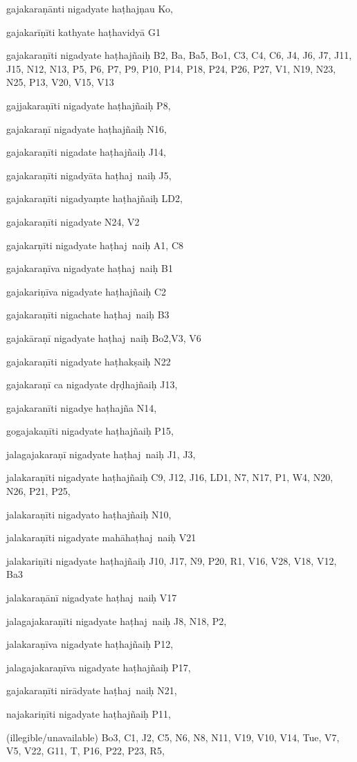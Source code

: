 \begin{ekdosis}
\begin{marma}[hp01_055]
\begin{marma}[hp02_009]
\begin{marma}[hp02_011]
 \begin{marma}[hp02_26d]
\item[gajakaraṇānti nigadyate haṭhajṇau] Ko,
\item[gajakarīṇīti kathyate haṭhavidyā] G1
\item[gajakaraṇīti nigadyate haṭhajñaiḥ] B2, Ba, Ba5, Bo1, C3, C4, C6, J4, J6, J7, J11, J15, N12, N13, P5, P6, P7, P9, P10, P14, P18, P24, P26, P27, V1, N19, N23, N25, P13, V20, V15, V13
\item[gajjakaraṇīti nigadyate haṭhajñaiḥ] P8, 
\item[gajakaraṇī nigadyate haṭhajñaiḥ] N16, 
\item[gajakaraṇīti nigadate haṭhajñaiḥ] J14,
\item[gajakaraṇīti nigadyāta haṭhaj~naiḥ] J5,
\item[gajakaraṇīti nigadyaṃte haṭhajñaiḥ] LD2,
\item[gajakaraṇīti nigadyate] N24, V2
\item[gajakarṇīti nigadyate haṭhaj~naiḥ] A1, C8
\item[gajakaraṇīva nigadyate haṭhaj~naiḥ] B1
\item[gajakariṇīva nigadyate haṭhajñaiḥ] C2
\item[gajakaraṇīti nigachate haṭhaj~naiḥ] B3
\item[gajakāraṇī nigadyate haṭhaj~naiḥ] Bo2,V3, V6
\item[gajakaraṇīti nigadyate haṭhakṣaiḥ] N22
\item[gajakaraṇī ca nigadyate dṛḍhajñaiḥ] J13,
\item[gajakaranīti nigadye haṭhajña] N14, 
\item[gogajakaṇīti nigadyate haṭhajñaiḥ] P15, 
\item[jalagajakaraṇī nigadyate haṭhaj~naiḥ] J1, J3, 
\item[jalakaraṇīti nigadyate haṭhajñaiḥ] C9, J12, J16, LD1, N7, N17, P1, W4, N20, N26, P21, P25, 
\item[jalakaraṇīti nigadyato haṭhajñaiḥ] N10,
\item[jalakaraṇīti nigadyate mahāhaṭhaj~naiḥ] V21
\item[jalakariṇīti nigadyate haṭhajñaiḥ] J10, J17, N9, P20, R1, V16, V28, V18, V12, Ba3
\item[jalakaraṇānī nigadyate haṭhaj~naiḥ] V17
\item[jalagajakaraṇīti nigadyate haṭhaj~naiḥ] J8, N18, P2,
\item[jalakaraṇīva nigadyate haṭhajñaiḥ] P12,
\item[jalagajakaraṇīva nigadyate haṭhajñaiḥ] P17, 
\item[gajakaraṇīti nirādyate haṭhaj~naiḥ] N21,
\item[najakariṇīti nigadyate haṭhajñaiḥ] P11, 
\item[(illegible/unavailable)] Bo3, C1, J2, C5, N6, N8, N11, V19, V10, V14, Tue, V7, V5, V22, G11, T, P16, P22, P23, R5,
  \begin{description}
    \end{description}
 \end{marma}


\end{marma}
\end{marma}
\end{marma}
\end{ekdosis}
